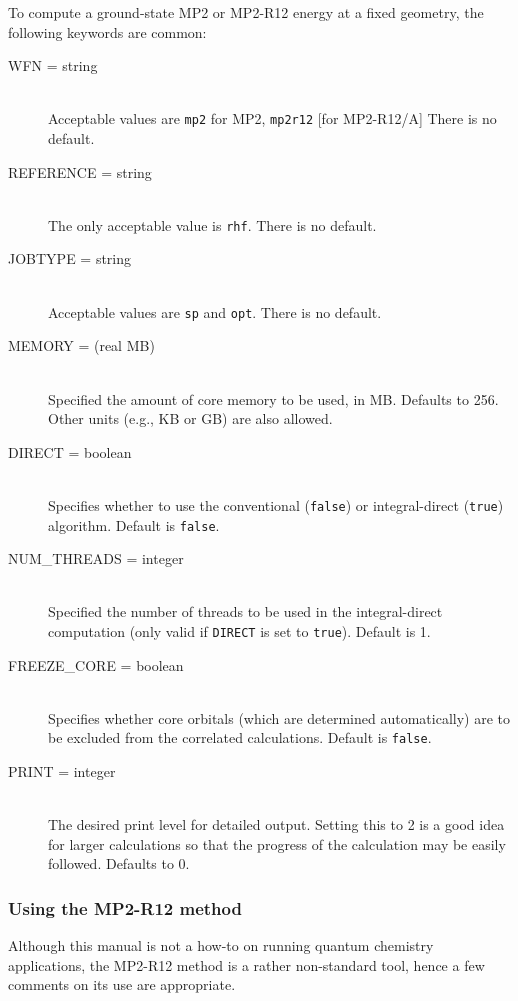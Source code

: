 To compute a ground-state MP2 or MP2-R12 energy at a fixed geometry,
the following keywords are common:
\begin{description}
\item[WFN = string]\mbox{}\\
Acceptable values are {\tt mp2} for MP2, {\tt mp2r12} [for MP2-R12/A]
There is no default.
\item[REFERENCE = string]\mbox{}\\
The only acceptable value is {\tt rhf}.
There is no default.
\item[JOBTYPE = string]\mbox{}\\
Acceptable values are {\tt sp} and {\tt opt}.  There is no default.
\item[MEMORY = (real MB)]\mbox{}\\
Specified the amount of core memory to be used, in MB.  Defaults to 256.
Other units (e.g., KB or GB) are also allowed.
\item[DIRECT = boolean]\mbox{}\\
Specifies whether to use the conventional ({\tt false}) or
integral-direct ({\tt true}) algorithm. Default is {\tt false}.
\item[NUM\_THREADS = integer]\mbox{}\\
Specified the number of threads to be used in the integral-direct
computation (only valid if {\tt DIRECT} is set to {\tt true}).
Default is 1.
\item[FREEZE\_CORE = boolean]\mbox{}\\
Specifies whether core orbitals (which are determined automatically) are to
be excluded from the correlated calculations.  Default is {\tt false}.
\item[PRINT = integer]\mbox{}\\
The desired print level for detailed output.  Setting this to 2 is a good
idea for larger calculations so that the progress of the calculation may be
easily followed.  Defaults to 0.
\end{description}

\subsubsection{Using the MP2-R12 method}
Although this manual is not a how-to on running
quantum chemistry applications, the MP2-R12 method is
a rather non-standard tool, hence a few comments on its
use are appropriate.

